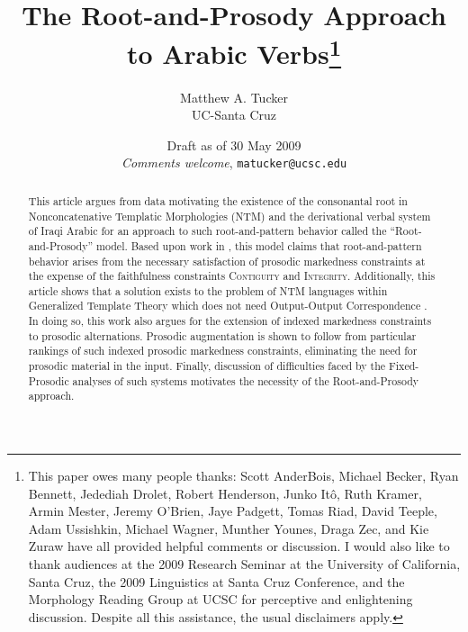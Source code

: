 \documentclass[12pt,twoside,letterpaper]{article}
\begin{document}



\title{The Root-and-Prosody Approach to Arabic Verbs\thanks{This paper owes many people thanks: Scott AnderBois, Michael Becker, Ryan Bennett, Jedediah Drolet, Robert Henderson, Junko It\^{o}, Ruth Kramer, Armin Mester, Jeremy O'Brien, Jaye Padgett, Tomas Riad, David Teeple, Adam Ussishkin, Michael Wagner, Munther Younes, Draga Zec, and Kie Zuraw have all provided helpful comments or discussion. I would also like to thank audiences at the 2009 Research Seminar at the University of California, Santa Cruz, the 2009 Linguistics at Santa Cruz Conference, and the Morphology Reading Group at UCSC for perceptive and enlightening discussion.  Despite all this assistance, the usual disclaimers apply.}}
\author{Matthew A. Tucker\\UC-Santa Cruz}
\date{Draft as of 30 May 2009\\{\em Comments welcome}, {\tt matucker@ucsc.edu}}

\maketitle


\begin{abstract}
This article argues from data motivating the existence of the consonantal root in Nonconcatenative Templatic Morphologies (NTM) and the derivational verbal system of Iraqi Arabic for an approach to such root-and-pattern behavior called the ``Root-and-Prosody'' model. Based upon work in \cite{kramer07}, this model claims that root-and-pattern behavior arises from the necessary satisfaction of prosodic markedness constraints at the expense of the faithfulness constraints \textsc{Contiguity} and \textsc{Integrity}. Additionally, this article shows that a solution exists to the problem of NTM languages within Generalized Template Theory \citep{mccarthy95} which does not need Output-Output Correspondence \citep{benua00,ussishkin05}. In doing so, this work also argues for the extension of indexed markedness constraints \cite{paterToAppear} to prosodic alternations. Prosodic augmentation is shown to follow from particular rankings of such indexed prosodic markedness constraints, eliminating the need for prosodic material in the input. Finally, discussion of difficulties faced by the Fixed-Prosodic analyses of such systems \citep{ussishkin00,buckley03,ussishkin05} motivates the necessity of the Root-and-Prosody approach.
\end{abstract}
\end{document}
